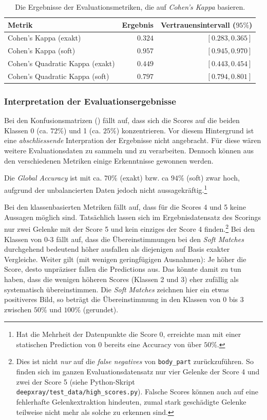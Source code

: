 \begin{table}[tbh]
    \center
    \begin{tabular}{l|r|r}
        Metrik & Ergebnis & Vertrauensintervall ($95\%$) \\ \hline
        Cohen's Kappa (exakt) & $0.324$ & $[0.283, 0.365]$ \\
        Cohen's Kappa (soft) & $0.957$ & $[0.945, 0.970]$ \\
        Cohen's Quadratic Kappa (exakt) & $0.449$ & $[0.443, 0.454]$ \\
        Cohen's Quadratic Kappa (soft) & $0.797$ & $[0.794, 0.801]$ \\
    \end{tabular}
    \caption{Die Ergebnisse der Evaluationsmetriken, die auf \textit{Cohen's Kappa} basieren.}
    \label{tbl:cohenskappa}
\end{table}

\subsubsection{Interpretation der Evaluationsergebnisse}

Bei den Konfusionsmatrizen () fällt auf, dass sich die Scores auf die beiden Klassen 0 (ca. $72\%$) und 1 (ca. $25\%$) konzentrieren. Vor diesem Hintergrund ist eine \textit{abschliessende} Interpration der Ergebnisse nicht angebracht. Für diese wären weitere Evaluationsdaten zu sammeln und zu verarbeiten. Dennoch können aus den verschiedenen Metriken einige Erkenntnisse gewonnen werden.

Die \textit{Global Accuracy} ist mit ca. $70\%$ (exakt) bzw. ca $94\%$ (soft) zwar hoch, aufgrund der unbalancierten Daten jedoch nicht aussagekräftig.\footnote{Hat die Mehrheit der Datenpunkte die Score 0, erreichte man mit einer statischen Prediction von 0 bereits eine Accuracy von über $50\%$.}

Bei den klassenbasierten Metriken fällt auf, dass für die Scores 4 und 5 keine Aussagen möglich sind. Tatsächlich lassen sich im Ergebnisdatensatz des Scorings nur zwei Gelenke mit der Score 5 und kein einziges der Score 4 finden.\footnote{Dies ist nicht \textit{nur} auf die \textit{false negatives} von \texttt{body\_part} zurückzuführen. So finden sich im ganzen Evaluationsdatensatz nur vier Gelenke der Score 4 und zwei der Score 5 (siehe Python-Skript \texttt{deepxray/test\_data/high\_scores.py}). Falsche Scores können auch auf eine fehlerhafte Gelenkextraktion hindeuten, zumal stark geschädigte Gelenke teilweise nicht mehr als solche zu erkennen sind.} Bei den Klassen von 0-3 fällt auf, dass die Übereinstimmungen bei den \textit{Soft Matches} durchgehend bedeutend höher ausfallen als diejenigen auf Basis exakter Vergleiche. Weiter gilt (mit wenigen geringfügigen Ausnahmen): Je höher die Score, desto unpräziser fallen die Predictions aus. Das könnte damit zu tun haben, dass die wenigen höheren Scores (Klassen 2 und 3) eher zufällig als systematisch übereinstimmen. Die \textit{Soft Matches} zeichnen hier ein etwas positiveres Bild, so beträgt die Übereinstimmung in den Klassen von 0 bis 3 zwischen $50\%$ und $100\%$ (gerundet).


